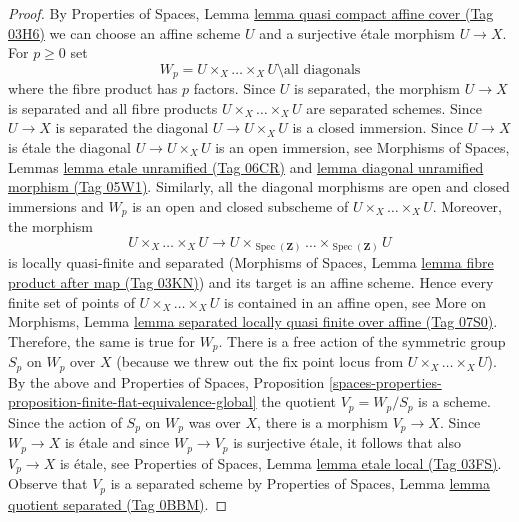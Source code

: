\documentclass{amsart}
\theoremstyle{plain}
\theoremstyle{definition}
\theoremstyle{remark}
\numberwithin{equation}{subsection}
\def\Spec{\mathop{\mathrm{Spec}}}
\begin{document}
\begin{proof}
By Properties of Spaces, Lemma
\href{https://stacks.math.columbia.edu/tag/03H6}{lemma quasi compact affine cover (Tag 03H6)}
we can choose an affine scheme $U$ and a surjective \'etale morphism
$U \to X$. For $p \geq 0$ set
$$
W_p = U \times_X \ldots \times_X U \setminus \text{all diagonals}
$$
where the fibre product has $p$ factors. Since $U$ is separated,
the morphism $U \to X$ is separated and all fibre products
$U \times_X \ldots \times_X U$ are separated schemes. Since $U \to X$ is
separated the diagonal $U \to U \times_X U$ is a closed immersion. Since
$U \to X$ is \'etale the diagonal $U \to U \times_X U$ is an open
immersion, see Morphisms of Spaces, Lemmas
\href{https://stacks.math.columbia.edu/tag/06CR}{lemma etale unramified (Tag 06CR)} and
\href{https://stacks.math.columbia.edu/tag/05W1}{lemma diagonal unramified morphism (Tag 05W1)}.
Similarly, all the diagonal morphisms are open and closed immersions and
$W_p$ is an open and closed subscheme of $U \times_X \ldots \times_X U$.
Moreover, the morphism
$$
U \times_X \ldots \times_X U \longrightarrow
U \times_{\Spec(\mathbf{Z})} \ldots \times_{\Spec(\mathbf{Z})} U
$$
is locally quasi-finite and separated (Morphisms of Spaces,
Lemma \href{https://stacks.math.columbia.edu/tag/03KN}{lemma fibre product after map (Tag 03KN)})
and its target is an affine scheme. Hence every finite set of points of
$U \times_X \ldots \times_X U$ is contained in an affine open, see
More on Morphisms, Lemma
\href{https://stacks.math.columbia.edu/tag/07S0}{lemma separated locally quasi finite over affine (Tag 07S0)}.
Therefore, the same is true for $W_p$.
There is a free action of the symmetric group $S_p$ on $W_p$ over $X$
(because we threw out the fix point locus from
$U \times_X \ldots \times_X U$). By the above and
Properties of Spaces, Proposition
\ref{spaces-properties-proposition-finite-flat-equivalence-global}
the quotient $V_p = W_p/S_p$ is a scheme. Since the action of
$S_p$ on $W_p$ was over $X$, there is a morphism $V_p \to X$.
Since $W_p \to X$ is \'etale and since $W_p \to V_p$ is surjective
\'etale, it follows that also $V_p \to X$ is \'etale, see
Properties of Spaces, Lemma \href{https://stacks.math.columbia.edu/tag/03FS}{lemma etale local (Tag 03FS)}.
Observe that $V_p$ is a separated scheme by
Properties of Spaces, Lemma
\href{https://stacks.math.columbia.edu/tag/0BBM}{lemma quotient separated (Tag 0BBM)}.


\end{proof}
\end{document}
